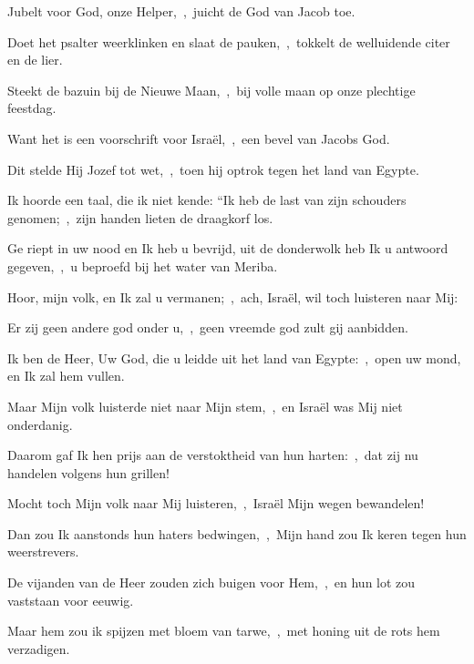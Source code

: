 \documentclass[12pt,twoside,a5paper]{article}
\begin{document}


\begin{halfparskip}
  Jubelt voor God, onze Helper,~\sep\ juicht de God van Jacob toe.


  Doet het psalter weerklinken en slaat de pauken,~\sep\ tokkelt de welluidende citer en de lier.

  Steekt de bazuin bij de Nieuwe Maan,~\sep\ bij volle maan op onze plechtige feestdag.

  Want het is een voorschrift voor Israël,~\sep\ een bevel van Jacobs God.

  Dit stelde Hij Jozef tot wet,~\sep\ toen hij optrok tegen het land van Egypte.
\end{halfparskip}


\begin{halfparskip}
  Ik hoorde een taal, die ik niet kende: ``Ik heb de last van zijn schouders genomen;~\sep\ zijn handen lieten de draagkorf los.

  Ge riept in uw nood en Ik heb u bevrijd, uit de donderwolk heb Ik u antwoord gegeven,~\sep\ u beproefd bij het water van Meriba.

  Hoor, mijn volk, en Ik zal u vermanen;~\sep\ ach, Israël, wil toch luisteren naar Mij:

  Er zij geen andere god onder u,~\sep\ geen vreemde god zult gij aanbidden.

  Ik ben de Heer, Uw God, die u leidde uit het land van Egypte:~\sep\ open uw mond, en Ik zal hem vullen.

  Maar Mijn volk luisterde niet naar Mijn stem,~\sep\ en Israël was Mij niet onderdanig.

  Daarom gaf Ik hen prijs aan de verstoktheid van hun harten:~\sep\ dat zij nu handelen volgens hun grillen!

  Mocht toch Mijn volk naar Mij luisteren,~\sep\ Israël Mijn wegen bewandelen!

  Dan zou Ik aanstonds hun haters bedwingen,~\sep\ Mijn hand zou Ik keren tegen hun weerstrevers.

  De vijanden van de Heer zouden zich buigen voor Hem,~\sep\ en hun lot zou vaststaan voor eeuwig.

  Maar hem zou ik spijzen met bloem van tarwe,~\sep\ met honing uit de rots hem verzadigen.
\end{halfparskip}
\end{document}
